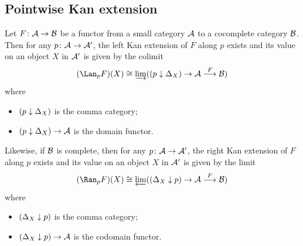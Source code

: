 \subsection{Pointwise Kan extension}
  \begin{thm}
    Let $F\colon{\cal A}\to{\cal B}$ be a functor from a small category ${\cal A}$ to a cocomplete category ${\cal B}$. Then for any $p\colon{\cal A}\to{\cal A}'$, the left Kan extension of $F$ along $p$ exists and its value on an object $X$ in ${\cal A}'$ is given by the colimit
    \begin{equation*}
      (\Lan_pF)(X)\cong\dirlim((p\down\Delta_X)\to\Aa\markar{F}\Bb)
    \end{equation*}
    where
    \begin{itemize}
      \item $(p\downarrow\Delta_X)$ is the comma category;
      \item $(p\downarrow\Delta_X)\to{\cal A}$ is the domain functor.
    \end{itemize}

    Likewise, if ${\cal B}$ is complete, then for any $p\colon{\cal A}\to{\cal A}'$, the right Kan extension of $F$ along $p$ exists and its value on an object $X$ in ${\cal A}'$ is given by the limit
    \begin{equation*}
      (\Ran_pF)(X)\cong\invlim((\Delta_X\down p)\to\Aa\markar{F}\Bb)
    \end{equation*}
    where
    \begin{itemize}
      \item $(\Delta_X\downarrow p)$ is the comma category;
      \item $(\Delta_X\downarrow p)\to{\cal A}$ is the codomain functor.
    \end{itemize}
  \end{thm}
